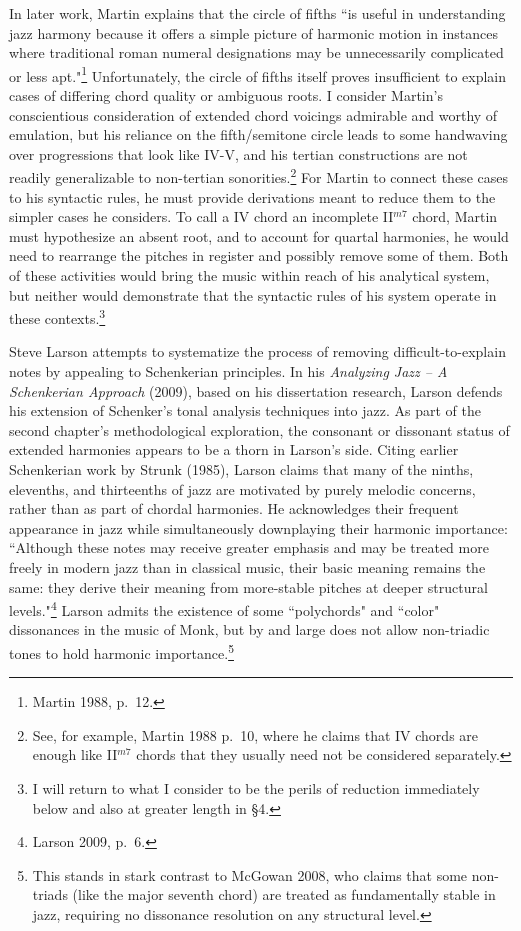 In later work, Martin explains that the circle of fifths ``is useful in understanding jazz harmony because it offers a simple picture of harmonic motion in instances where traditional roman numeral designations may be unnecessarily complicated or less apt."\footnote{Martin 1988, p.\ 12.}  Unfortunately, the circle of fifths itself proves insufficient to explain cases of differing chord quality or ambiguous roots.  I consider Martin's conscientious consideration of extended chord voicings admirable and worthy of emulation, but his reliance on the fifth/semitone circle leads to some handwaving over progressions that look like IV-V, and his tertian constructions are not readily generalizable to non-tertian sonorities.\footnote{See, for example, Martin 1988 p.\ 10, where he claims that IV chords are enough like II$^{m7}$ chords that they usually need not be considered separately.}  For Martin to connect these cases to his syntactic rules, he must provide derivations meant to reduce them to the simpler cases he considers.  To call a IV chord an incomplete II$^{m7}$ chord, Martin must hypothesize an absent root, and to account for quartal harmonies, he would need to rearrange the pitches in register and possibly remove some of them.  Both of these activities would bring the music within reach of his analytical system, but neither would demonstrate that the syntactic rules of his system operate in these contexts.\footnote{I will return to what I consider to be the perils of reduction immediately below and also at greater length in \S 4.}

Steve Larson attempts to systematize the process of removing difficult-to-explain notes by appealing to Schenkerian principles.  In his \emph{Analyzing Jazz -- A Schenkerian Approach} (2009), based on his dissertation research, Larson defends his extension of Schenker's tonal analysis techniques into jazz.  As part of the second chapter's methodological exploration, the consonant or dissonant status of extended harmonies appears to be a thorn in Larson's side.  Citing earlier Schenkerian work by Strunk (1985), Larson claims that many of the ninths, elevenths, and thirteenths of jazz are motivated by purely melodic concerns, rather than as part of chordal harmonies.  He acknowledges their frequent appearance in jazz while simultaneously downplaying their harmonic importance: ``Although these notes may receive greater emphasis and may be treated more freely in modern jazz than in classical music, their basic meaning remains the same: they derive their meaning from more-stable pitches at deeper structural levels."\footnote{Larson 2009, p.\ 6.}  Larson admits the existence of some ``polychords" and ``color" dissonances in the music of Monk, but by and large does not allow non-triadic tones to hold harmonic importance.\footnote{This stands in stark contrast to McGowan 2008, who claims that some non-triads (like the major seventh chord) are treated as fundamentally stable in jazz, requiring no dissonance resolution on any structural level.}

